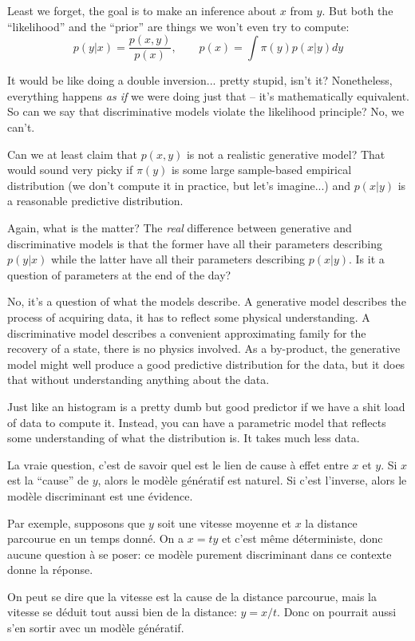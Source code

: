 \documentclass{article}
\begin{document}
Least we forget, the goal is to make an inference about $x$ from $y$. But both the ``likelihood'' and the ``prior'' are things we won't even try to compute: 
$$
p(y|x) = \frac{p(x,y)}{p(x)}, 
\qquad
p(x) = \int \pi(y) p(x|y) dy
$$

It would be like doing a double inversion... pretty stupid, isn't it? Nonetheless, everything happens {\em as if} we were doing just that -- it's mathematically equivalent. So can we say that discriminative models violate the likelihood principle? No, we can't.

Can we at least claim that $p(x,y)$ is not a realistic generative model? That would sound very picky if $\pi(y)$ is some large sample-based empirical distribution (we don't compute it in practice, but let's imagine...) and $p(x|y)$ is a reasonable predictive distribution. 

Again, what is the matter? The {\em real} difference between generative and discriminative models is that the former have all their parameters describing $p(y|x)$ while the latter have all their parameters describing $p(x|y)$. Is it a question of parameters at the end of the day?

No, it's a question of what the models describe. A generative model describes the process of acquiring data, it has to reflect some physical understanding. A discriminative model describes a convenient approximating family for the recovery of a state, there is no physics involved. As a by-product, the generative model might well produce a good predictive distribution for the data, but it does that without understanding anything about the data.

Just like an histogram is a pretty dumb but good predictor if we have a shit load of data to compute it. Instead, you can have a parametric model that reflects some understanding of what the distribution is. It takes much less data.

La vraie question, c'est de savoir quel est le lien de cause \`a effet entre $x$ et $y$. Si $x$ est la ``cause'' de $y$, alors le mod\`ele g\'en\'eratif est naturel. Si c'est l'inverse, alors le mod\`ele discriminant est une \'evidence.

Par exemple, supposons que $y$ soit une vitesse moyenne et $x$ la distance parcourue en un temps donn\'e. On a $x=t y$ et c'est m\^eme d\'eterministe, donc aucune question \`a se poser: ce mod\`ele purement discriminant dans ce contexte donne la r\'eponse.

On peut se dire que la vitesse est la cause de la distance parcourue, mais la vitesse se d\'eduit tout aussi bien de la distance: $y=x/t$. Donc on pourrait aussi s'en sortir avec un mod\`ele g\'en\'eratif.
\end{document}
